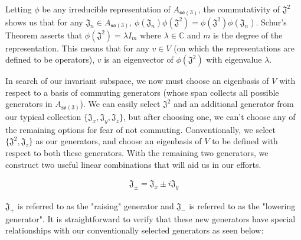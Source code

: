 \documentclass[10pt]{ucthesis}
\newcommand{\C}{\mathbb{C}}
\begin{document}
Letting $\phi$ be any irreducible representation of $A_\mathfrak{so(3)}$, the commutativity of $\mathfrak{J^2}$ shows us that for any $\mathfrak{J}_n \in A_\mathfrak{so(3)}$, $\phi(\mathfrak{J}_n)\phi(\mathfrak{J^2}) = \phi(\mathfrak{J^2})\phi(\mathfrak{J}_n)$. Schur's Theorem asserts that $\phi(\mathfrak{J^2}) = \lambda I_m$ where $\lambda\in\C$ and $m$ is the degree of the representation. This means that for any $v\in V$ (on which the representations are defined to be operators), $v$ is an eigenvector of $\phi(\mathfrak{J^2})$ with eigenvalue $\lambda$.

In search of our invariant subspace, we now must choose an eigenbasis of $V$ with respect to a basis of commuting generators (whose span collects all possible generators in $A_\mathfrak{so(3)}$). We can easily select $\mathfrak{J^2}$ and an additional generator from our typical collection $\{\mathfrak{J}_x,\mathfrak{J}_y,\mathfrak{J}_z\}$, but after choosing one, we can't choose any of the remaining options for fear of not commuting. Conventionally, we select $\{\mathfrak{J^2},\mathfrak{J}_z\}$ as our generators, and choose an eigenbasis of $V$ to be defined with respect to both these generators. With the remaining two generators, we construct two useful linear combinations that will aid us in our efforts.

\begin{equation}
	\begin{aligned}
		\mathfrak{J}_\pm = \mathfrak{J}_x \pm i\mathfrak{J}_y
	\end{aligned}
\end{equation} 

$\mathfrak{J}_+$ is referred to as the "raising" generator and $\mathfrak{J}_-$ is referred to as the "lowering generator". It is straightforward to verify that these new generators have special relationships with our conventionally selected generators as seen below:
\end{document}
